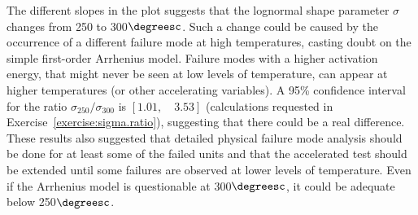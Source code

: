 \begin{example}
The different slopes in the plot suggests that the lognormal shape
parameter $\sigma$ changes from 250 to 300$\degreesc$. Such a change
could be caused by the occurrence of a different failure mode at high
temperatures, casting doubt on the simple first-order Arrhenius model.
Failure modes with a higher activation energy, that
might never be seen at low levels of temperature, can appear at higher
temperatures (or other accelerating variables).  A 95\% confidence
interval for the ratio $\sigma_{250}/\sigma_{300}$ is $[1.01, \quad
3.53]$ (calculations requested in
Exercise~\ref{exercise:sigma.ratio}), suggesting that there could be a
real difference. These results also suggested that detailed physical
failure mode analysis should be done for at least some of the failed
units and that the accelerated test should be extended until some
failures are observed at lower levels of temperature. Even if the
Arrhenius model is questionable at 300$\degreesc$, it could be
adequate below 250$\degreesc$.


\end{example}
